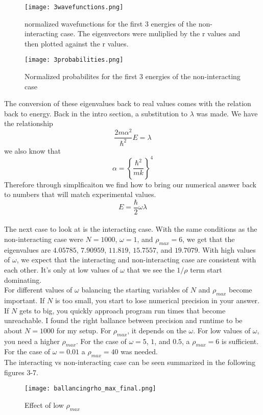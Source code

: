 \documentclass[%
 reprint,
 amsmath,amssymb,
 aps,
]{revtex4-1}
\begin{document}
\begin{figure}[h]
\texttt{[image: 3wavefunctions.png]}
\caption{normalized wavefunctions for the first 3 energies of the non-interacting case. The eigenvectors were muliplied by the r values and then plotted against the r values.}
\label{fig:wavefunctions}
\end{figure}
\begin{figure}[h]
\texttt{[image: 3probabilities.png]}
\caption{Normalized probabilites for the first 3 energies of the non-interacting case}
\label{fig:probabilites}
\end{figure}

The conversion of these eigenvalues back to real values comes with the relation back to energy. Back in the intro section, a substitution to $\lambda$ was made. We have the relationship
\[ \frac{2m\alpha^2}{\hbar^2} E = \lambda \]
we also know that 
\[\alpha = \left \{\frac{\hbar^2}{mk}\right \}^4 \]
Therefore through simplficaiton we find how to bring our numerical answer back to numbers that will match experimental values. 
\[ E = \frac{\hbar}{2}\omega \lambda\] \\

The next case to look at is the interacting case. With the same conditions as the non-interacting case were $N=1000$, $\omega = 1$, and $\rho_{max} = 6$, we get that the eigenvalues are $4.05785$, $7.90959$, $11.819$, $15.7557$, and $19.7079$. With high values of $\omega$, we expect that the interacting and non-interacting case are consistent with each other. It's only at low values of $\omega$ that we see the $1/\rho$ term start dominating. \\

For different values of $\omega$ balancing the starting variables of $N$ and $\rho_{max}$ become important. If $N$ is too small, you start to lose numerical precision in your answer. If $N$ gets to big, you quickly approach program run times that become unreachable. I found the right ballance between precision and runtime to be about $N = 1000$ for my setup. For $\rho_{max}$, it depends on the $\omega$. For low values of $\omega$, you need a higher $\rho_{max}$. For the case of $\omega = 5$, $1$, and $0.5$, a $\rho_{max} = 6$ is sufficient. For the case of $\omega = 0.01$ a $\rho_{max} = 40$ was needed.\\

The interacting vs non-interacting case can be seen summarized in the following figures 3-7.
\begin{figure}[h]
\texttt{[image: ballancingrho\_max\_final.png]}
\caption{Effect of low $\rho_{max}$}
\label{fig:bad}
\end{figure}
\end{document}
